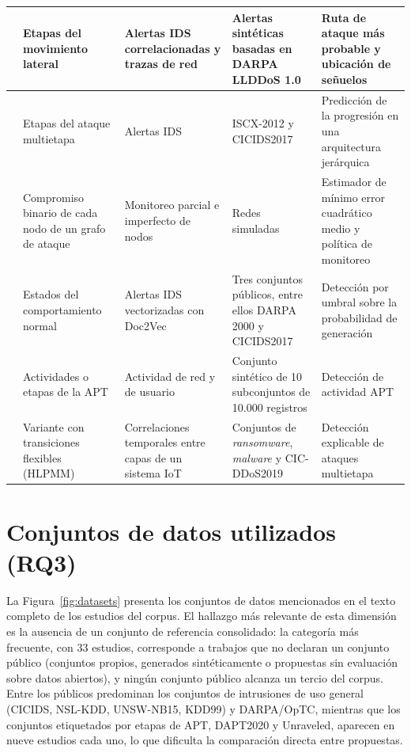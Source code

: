 \begin{footnotesize}
\begin{xltabular}{\linewidth}{|>{\raggedright\arraybackslash}p{2.6cm}|*{4}{>{\raggedright\arraybackslash}X|}}
\textcite{al_amin_hidden_2021} & Etapas del movimiento lateral & Alertas IDS correlacionadas y trazas de red & Alertas sintéticas basadas en DARPA LLDDoS 1.0 & Ruta de ataque más probable y ubicación de señuelos \\ \hline
\textcite{y_javed_prism_2023} & Etapas del ataque multietapa & Alertas IDS & ISCX-2012 y CICIDS2017 & Predicción de la progresión en una arquitectura jerárquica \\ \hline
\textcite{kazeminajafabadi_optimal_2023} & Compromiso binario de cada nodo de un grafo de ataque & Monitoreo parcial e imperfecto de nodos & Redes simuladas & Estimador de mínimo error cuadrático medio y política de monitoreo \\ \hline
\textcite{ma_anomaly_2024} & Estados del comportamiento normal & Alertas IDS vectorizadas con Doc2Vec & Tres conjuntos públicos, entre ellos DARPA 2000 y CICIDS2017 & Detección por umbral sobre la probabilidad de generación \\ \hline
\textcite{mittal_proactive_2025} & Actividades o etapas de la APT & Actividad de red y de usuario & Conjunto sintético de 10 subconjuntos de 10.000 registros & Detección de actividad APT \\ \hline
\textcite{kumar_hlpmmgrsphtru_2026} & Variante con transiciones flexibles (HLPMM) & Correlaciones temporales entre capas de un sistema IoT & Conjuntos de \textit{ransomware}, \textit{malware} y CIC-DDoS2019 & Detección explicable de ataques multietapa \\
\end{xltabular}
\end{footnotesize}
\FloatBarrier

\section{Conjuntos de datos utilizados (RQ3)}

La Figura~\ref{fig:datasets} presenta los conjuntos de datos mencionados en el texto completo de los estudios del corpus. El hallazgo más relevante de esta dimensión es la ausencia de un conjunto de referencia consolidado: la categoría más frecuente, con 33 estudios, corresponde a trabajos que no declaran un conjunto público (conjuntos propios, generados sintéticamente o propuestas sin evaluación sobre datos abiertos), y ningún conjunto público alcanza un tercio del corpus. Entre los públicos predominan los conjuntos de intrusiones de uso general (CICIDS, NSL-KDD, UNSW-NB15, KDD99) y DARPA/OpTC, mientras que los conjuntos etiquetados por etapas de APT, DAPT2020 y Unraveled, aparecen en nueve estudios cada uno, lo que dificulta la comparación directa entre propuestas.


